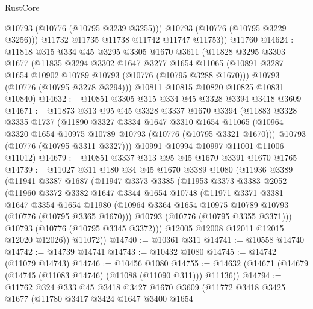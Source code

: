 \begin{lexlean}{RustCore}
\begin{coremodule}
            @10793
            (@10776 (@10795 @3239 @3255)))
          @10793
          (@10776 (@10795 @3229 @3256)))
        @11732
        @11735
        @11738
        @11742
        @11747
        @11753))
    @11760
@14624 := @11818
    @315
    @334
    @45
    @3295
    @3305
    @1670
    @3611
    (@11828
      @3295
      @3303
      @1677
      (@11835
        @3294
        @3302
        @1647
        @3277
        @1654
        @11065
        (@10891 @3287 @1654 @10902 @10789 @10793 (@10776 (@10795 @3288 @1670)))
        @10793
        (@10776 (@10795 @3278 @3294)))
      @10811
      @10815
      @10820
      @10825
      @10831
      @10840)
@14632 := @10851 @3305 @315 @334 @45 @3328 @3394 @3418 @3609
@14671 := @11873
    @313
    @95
    @45
    @3328
    @3337
    @1670
    @3394
    (@11883
      @3328
      @3335
      @1737
      (@11890
        @3327
        @3334
        @1647
        @3310
        @1654
        @11065
        (@10964 @3320 @1654 @10975 @10789 @10793 (@10776 (@10795 @3321 @1670)))
        @10793
        (@10776 (@10795 @3311 @3327)))
      @10991
      @10994
      @10997
      @11001
      @11006
      @11012)
@14679 := @10851 @3337 @313 @95 @45 @1670 @3391 @1670 @1765
@14739 := @11027
    @311
    @180
    @34
    @45
    @1670
    @3389
    @1080
    (@11936
      @3389
      (@11941
        @3387
        @1687
        (@11947
          @3373
          @3385
          (@11953
            @3373
            @3383
            @2052
            (@11960
              @3372
              @3382
              @1647
              @3344
              @1654
              @10748
              (@11971
                @3371
                @3381
                @1647
                @3354
                @1654
                @11980
                (@10964 @3364 @1654 @10975 @10789 @10793 (@10776 (@10795 @3365 @1670)))
                @10793
                (@10776 (@10795 @3355 @3371)))
              @10793
              (@10776 (@10795 @3345 @3372)))
            @12005
            @12008
            @12011
            @12015
            @12020
            @12026))
        @11072))
@14740 := @10361 @311
@14741 := @10558 @14740
@14742 := @14739 @14741
@14743 := @10432 @1080
@14745 := @14742 (@11079 @14743)
@14746 := @10456 @1080
@14755 := @14632 (@14671 (@14679 (@14745 (@11083 @14746) (@11088 (@11090 @311))) @11136))
@14794 := @11762
    @324
    @333
    @45
    @3418
    @3427
    @1670
    @3609
    (@11772
      @3418
      @3425
      @1677
      (@11780
        @3417
        @3424
        @1647
        @3400
        @1654

\end{coremodule}
\end{lexlean}
